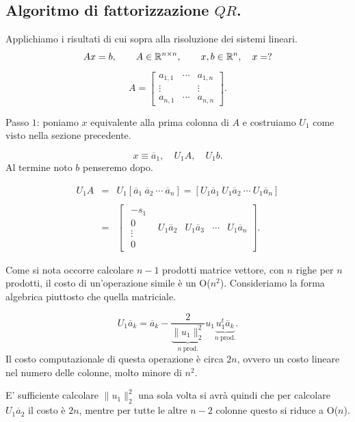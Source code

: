 \subsection{Algoritmo di fattorizzazione $QR$.}
Applichiamo i risultati di cui sopra alla risoluzione dei sistemi lineari.
\[Ax = b, \qquad A \in \mathbb{R}^{n \times n}, \qquad x,b \in \mathbb{R}^n,\quad x = ?\]

\[A = \left[
\begin{array}{ccc}
a_{1,1} & \cdots & a_{1,n} \\
\vdots &        & \vdots \\
a_{n,1} & \cdots & a_{n,n}
\end{array}
\right].\]

Passo $1$: poniamo $x$ equivalente alla prima colonna di $A$ e costruiamo
$U_1$ come visto nella sezione precedente.

\[
x \equiv \overline{a}_1, \quad U_1A, \quad U_1b.
\]
Al termine noto $b$ penseremo dopo.

\[
\begin{array}{lcl}
U_1A & = & U_1\left[\overline{a}_1 \ \overline{a}_2 \ \cdots\ \overline{a}_n
\right]
 =  \left[U_1\overline{a}_1 \ U_1\overline{a}_2 \ \cdots\ U_1\overline{a}_n
\right] \\
\\
& = & \left[
\begin{array}{c|c|c|c|c}
\begin{array}{c}-s_1 \\ 0 \\ \vdots \\ 0 \end{array} &
U_1\overline{a}_2 &
U_1\overline{a}_3 &
\cdots &
U_1\overline{a}_n
\end{array}\right].
\end{array}
\]

Come si nota occorre calcolare $n-1$ prodotti matrice vettore, con
$n$ righe per $n$ prodotti, il costo di un'operazione simile è un O($n^2$).
Consideriamo la forma algebrica piuttosto che quella matriciale.

\[
U_1\overline{a}_k = \overline{a}_k -
\frac{2}{\underbrace{\|u_1\|_2^2}_{n \ \textrm{prod.}}}u_1
\underbrace{u_1^t\overline{a}_k}_{n \ \textrm{prod.}}.
\]
Il costo computazionale di questa operazione è circa $2n$, ovvero un costo
lineare nel numero delle colonne, molto minore di $n^2$.

\begin{osse}E' sufficiente calcolare $\|u_1\|_2^2$ una sola volta si avrà
quindi che per calcolare $U_1\overline{a}_2$ il costo è $2n$, mentre per tutte
le altre $n-2$ colonne questo si riduce a O($n$).
\end{osse}

